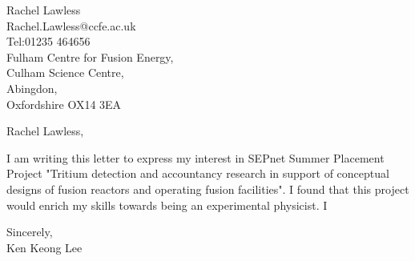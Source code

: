 \documentclass[11pt]{letter} %
\begin{document}

\begin{letter}{Rachel Lawless\\Rachel.Lawless@ccfe.ac.uk\\Tel:01235 464656\\Fulham Centre for Fusion Energy,\\Culham Science Centre,\\Abingdon,\\Oxfordshire OX14 3EA}


\opening{Rachel Lawless,} 

I am writing this letter to express my interest in SEPnet Summer Placement Project "Tritium detection and accountancy research in support of conceptual designs of fusion reactors and operating fusion facilities". I found that this project would enrich my skills towards being an experimental physicist. I 


\closing{Sincerely,\\Ken Keong Lee}




\end{letter}
\end{document}
